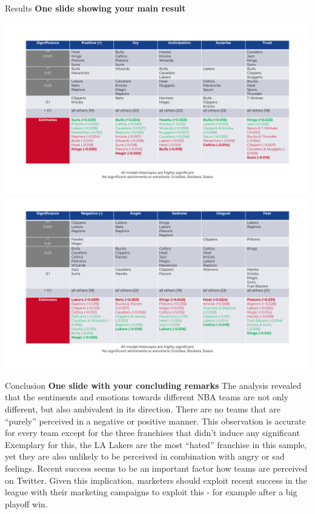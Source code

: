 \documentclass[
  ignorenonframetext,
]{beamer}
\begin{document}
\begin{frame}{Results}
\protect\hypertarget{results}{}
\textbf{One slide showing your main result}

\includegraphics[width=55.56in]{../output/Positive Sentiments & Emotions}
\includegraphics[width=55.56in]{../output/Negative Sentiments & Emotions}
\end{frame}

\begin{frame}{Conclusion}
\protect\hypertarget{conclusion}{}
\textbf{One slide with your concluding remarks} The analysis revealed
that the sentiments and emotions towards different NBA teams are not
only different, but also ambivalent in its direction. There are no teams
that are ``purely'' perceived in a negative or positive manner. This
observation is accurate for every team except for the three franchises
that didn't induce any significant Exemplary for this, the LA Lakers are
the most ``hated'' franchise in this sample, yet they are also unlikely
to be perceived in combination with angry or sad feelings. Recent
success seems to be an important factor how teams are perceived on
Twitter. Given this implication, marketers should exploit recent success
in the league with their marketing campaigns to exploit this - for
example after a big playoff win.
\end{frame}
\end{document}
